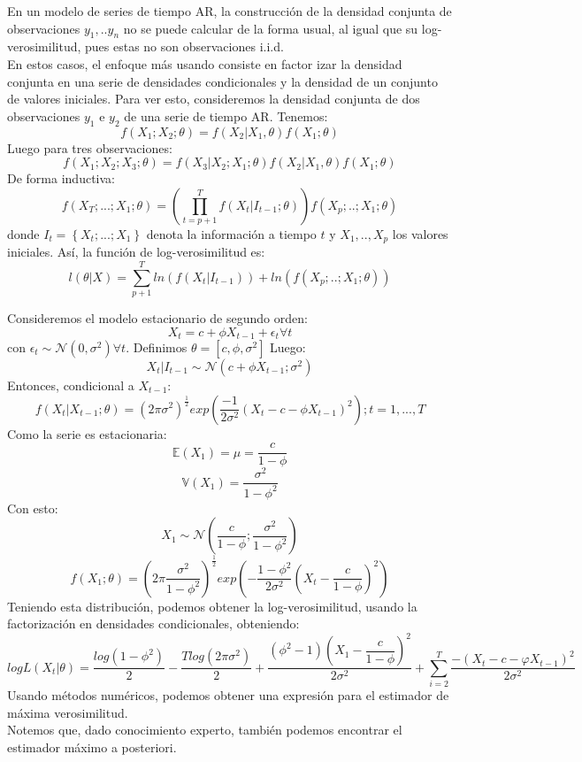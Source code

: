 En un modelo de series de tiempo AR, la construcción de la densidad conjunta de observaciones $y_1,..y_n$ no se puede calcular de la forma usual, al igual que su log-verosimilitud, pues estas no son observaciones i.i.d.\\ 
En estos casos, el enfoque más usando consiste en factor izar la densidad conjunta en una serie de densidades condicionales y la densidad de un conjunto de valores iniciales. Para ver esto, consideremos la densidad conjunta de dos observaciones $y_1$ e $y_2$ de una serie de tiempo AR. Tenemos: 
$$
f(X_1;X_2;\theta)= f(X_2|X_1,\theta) f(X_1;\theta) 
$$
Luego para tres observaciones: 
$$
f(X_1;X_2;X_3;\theta)= f(X_3|X_2;X_1;\theta) f(X_2|X_1,\theta) f(X_1;\theta) 
$$
De forma inductiva: 
$$
f(X_T;...;X_1;\theta)=(\prod_{t=p+1}^{T} f(X_t | I_{t-1} ;\theta )) f(X_p;..;X_1;\theta)  
$$
donde $I_t= \left \{ X_t;...;X_1 \right \}$ denota la información a tiempo $t$ y $X_1,..,X_p$ los valores iniciales. Así, la función de log-verosimilitud es: 
$$
l(\theta | X) = \sum_{p+1}^{T} ln(f( X_t | I_{t-1} )) + ln(f(X_p;..;X_1;\theta))
$$
\begin{example}
Consideremos el modelo estacionario de segundo orden: 
$$
X_t=c+\phi X_{t-1} + \epsilon_t \forall t
$$
con $\epsilon_t \sim  \mathcal{N}(0,\sigma^2) \forall t $. Definimos $\theta= [c, \phi, \sigma^{2} ]$
Luego: 
$$
X_t | I_{t-1} \sim  \mathcal{N}(c+\phi X_{t-1};\sigma^{2})
$$
Entonces, condicional a $X_{t-1}$:
$$
f(X_t | X_{t-1};\theta) = (2 \pi \sigma^{2} )^{\frac{1}{2}} exp ( \frac{-1}{2 \sigma^2} (X_t-c-\phi X_{t-1} )^2);  t=1,...,T 
$$
Como la serie es estacionaria: 
$$
\mathbb{E}(X_1)=\mu=\dfrac{c}{1- \phi}
$$
$$
\mathbb{V} (X_1) = \dfrac{\sigma^2}{1-\phi^2}
$$
Con esto: 
$$
X_1 \sim \mathcal{N}(\dfrac{c}{1- \phi};\dfrac{\sigma^2}{1-\phi^2} )
$$
$$
f(X_1;\theta) = (2 \pi \dfrac{\sigma^2}{1-\phi^2})^{\frac{1}{2}} exp ( -\frac{1-\phi^2}{2\sigma^2} (X_t- \dfrac{c}{1- \phi})^2)
$$
Teniendo esta distribución, podemos obtener la log-verosimilitud, usando la factorización en densidades condicionales, obteniendo:  
$$
log L(X_{t}|\theta) = \dfrac{log(1 -\phi^{2})}{2} - \dfrac{T log(2 \pi \sigma^{2})}{2} + \dfrac{(\phi^{2}-1)(X_{1}-\dfrac{c}{1-\phi})^{2}}{2\sigma^{2}}+ 
    \sum_{i=2}^{T} \dfrac{-(X_{t}-c-\varphi X_{t-1})^{2} }{2\sigma^{2}}
$$
Usando métodos numéricos, podemos obtener una expresión para el estimador de máxima verosimilitud. \\
Notemos que, dado conocimiento experto, también podemos encontrar el estimador máximo a posteriori. 
\end{example}

 